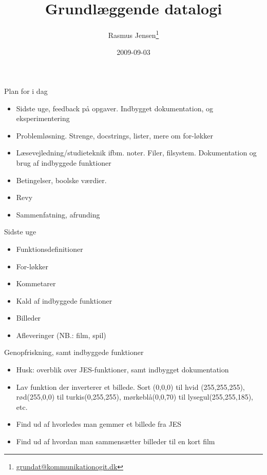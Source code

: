 \documentclass[a4paper,landscape]{slides}
\title{Grundlæggende datalogi}
\author{Rasmus Jensen\footnote{\url{grundat@kommunikationogit.dk}}}
\date{2009-09-03}
\begin{document}
\maketitle


\begin{slide}
	\begin{center} {\large 
            Plan for i dag
	} \end{center}
	\begin{itemize} \addtolength{\itemsep}{-\baselineskip}
    		\item Sidste uge, feedback på opgaver. Indbygget dokumentation, og eksperimentering
    		\item Problemløsning. Strenge, docstrings, lister, mere om for-løkker
    		\item Læsevejledning/studieteknik ifbm. noter. Filer, filsystem. Dokumentation og brug af indbyggede funktioner
    		\item Betingelser, boolske værdier.
    		\item Revy
    		\item Sammenfatning, afrunding
	\end{itemize}
\end{slide}

\begin{slide}
	\begin{center} {\large 
            Sidste uge
	} \end{center}
	\begin{itemize} \addtolength{\itemsep}{-\baselineskip}
		\item Funktionsdefinitioner
		\item For-løkker
		\item Kommetarer
		\item Kald af indbyggede funktioner
                \item Billeder
                \item Afleveringer (NB.: film, spil)
	\end{itemize} 
\end{slide}

\begin{slide}
	\begin{center} {\large 
            Genopfriskning, samt indbyggede funktioner
	} \end{center}
	\begin{itemize} \addtolength{\itemsep}{-\baselineskip}
		\item Husk: overblik over JES-funktioner, samt indbygget dokumentation
		\item Lav funktion der inverterer et billede. Sort (0,0,0) til hvid (255,255,255), rød(255,0,0) til turkis(0,255,255), mørkeblå(0,0,70) til lysegul(255,255,185), etc.
		\item Find ud af hvorledes man gemmer et billede fra JES
		\item Find ud af hvordan man sammensætter billeder til en kort film
	\end{itemize}
\end{slide}
\end{document}
